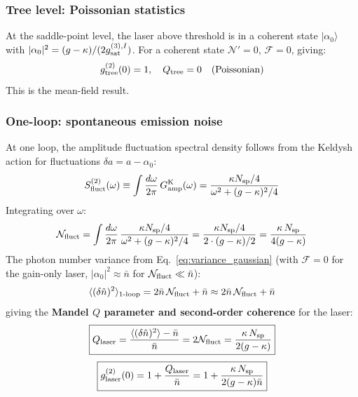\documentclass[12pt]{article}
\newcommand{\Keldysh}{{\rm K}}
\begin{document}
\subsubsection*{Tree level: Poissonian statistics}

At the saddle-point level, the laser above threshold is in a coherent state
$|\alpha_0\rangle$ with $|\alpha_0|^2 = (g-\kappa)/(2g^{(3),I}_{\rm sat})$.
For a coherent state $\mathcal{N}'=0$, $\mathcal{F}=0$, giving:
\begin{equation}
  g^{(2)}_{\rm tree}(0) = 1,\quad
  Q_{\rm tree} = 0 \quad\text{(Poissonian)}
  \label{eq:g2_tree}
\end{equation}
This is the mean-field result.

\subsubsection*{One-loop: spontaneous emission noise}

At one loop, the amplitude fluctuation spectral density follows from the
Keldysh action for fluctuations $\delta a = a - \alpha_0$:
\begin{equation}
  S^{(2)}_{\rm fluct}(\omega) \equiv
  \int\frac{d\omega}{2\pi}\,G^\Keldysh_{\rm amp}(\omega)
  = \frac{\kappa N_{\rm sp}/4}{\omega^2 + (g-\kappa)^2/4}
  \label{eq:amp_noise_spectrum}
\end{equation}
Integrating over $\omega$:
\begin{equation}
  \mathcal{N}_{\rm fluct}
  = \int\frac{d\omega}{2\pi}\,
  \frac{\kappa N_{\rm sp}/4}{\omega^2+(g-\kappa)^2/4}
  = \frac{\kappa N_{\rm sp}/4}{2\cdot(g-\kappa)/2}
  = \frac{\kappa\,N_{\rm sp}}{4(g-\kappa)}
  \label{eq:N_fluct}
\end{equation}
The photon number variance from Eq.~\eqref{eq:variance_gaussian}
(with $\mathcal{F}=0$ for the gain-only laser, $|\alpha_0|^2\approx\bar{n}$ for
$\mathcal{N}_{\rm fluct}\ll\bar{n}$):
\begin{equation}
  \langle(\delta\hat{n})^2\rangle_{\rm 1\text{-}loop}
  = 2\bar{n}\,\mathcal{N}_{\rm fluct} + \bar{n}
  \approx 2\bar{n}\,\mathcal{N}_{\rm fluct} + \bar{n}
  \label{eq:variance_1loop}
\end{equation}
giving the \textbf{Mandel $Q$ parameter and second-order coherence}
\cite{Mandel1995,GardinerZoller2004} for the laser:
\begin{equation}
  \boxed{
  Q_{\rm laser} =
  \frac{\langle(\delta\hat{n})^2\rangle - \bar{n}}{\bar{n}}
  = 2\mathcal{N}_{\rm fluct}
  = \frac{\kappa\,N_{\rm sp}}{2(g-\kappa)}
  }
  \label{eq:Mandel_Q_laser}
\end{equation}
\begin{equation}
  \boxed{
  g^{(2)}_{\rm laser}(0) = 1 +
  \frac{Q_{\rm laser}}{\bar{n}}
  = 1 + \frac{\kappa\,N_{\rm sp}}{2(g-\kappa)\bar{n}}
  }
  \label{eq:g2_laser}
\end{equation}
\end{document}
